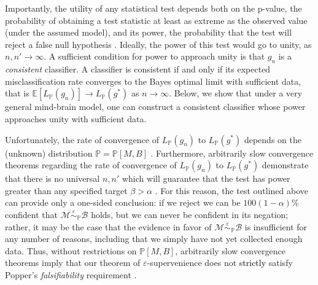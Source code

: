 \documentclass{article}
\newcommand{\conv}{\rightarrow}
\newcommand{\mB}{\mathcal{B}}
\newcommand{\mM}{\mathcal{M}}
\newcommand{\PP}{\mathbb{P}}           %
\newcommand{\EE}{\mathbb{E}}           %
\newcommand{\eps}{\varepsilon}
\providecommand{\mc}[1]{\mathcal{#1}}
\newcommand{\MeB}{\mM \overset{\varepsilon}{{\sim}}_{\PP} \mB}
\providecommand{\tr}[1]{\textcolor{black}{#1}}
\newtheorem{thm}{Theorem}
\begin{document}
Importantly, the utility of any statistical test depends both on the p-value, the probability of obtaining a test statistic at least as extreme as the observed value (under the assumed model), and its power, the probability that the test will reject a false null hypothesis%
.  Ideally, the power of this test would go to unity, as $n,n' \rightarrow \infty$.  A sufficient condition for power to approach unity is that $g_n$ is a \emph{consistent} classifier.  A classifier is consistent if and only if its expected misclassification rate converges to the Bayes optimal limit with sufficient data, that is $\EE[L_{\PP}(g_n)] \conv L_{\PP}(g^*)$ as $n\conv \infty$. %
% 
Below, we show that under a very general mind-brain model, one can construct a consistent classifier whose power approaches unity with sufficient data.

Unfortunately, the rate of convergence of $L_{\PP}(g_n)$ to $L_{\PP}(g^*)$ depends on the (unknown) distribution $\PP=\PP[M,B]$ \cite{DGL96}. Furthermore, arbitrarily slow convergence theorems regarding the rate of convergence of $L_{\PP}(g_n)$ to $L_{\PP}(g^*)$ demonstrate that there is no universal $n,n'$ which will guarantee that the test has power greater than any specified target $\beta > \alpha$ \cite{Devroye83}. For this reason, the test outlined above can provide only a one-sided conclusion: if we reject we can be $100(1-\alpha)$\% confident that $\MeB$ holds, but we can never be confident in its negation; rather, %
it may be the case that the evidence in favor of $\MeB$ is insufficient for any number of reasons, including that we simply have not yet collected enough data. %
Thus, without restrictions on $\PP[M,B]$, arbitrarily slow convergence theorems imply that our theorem of $\varepsilon$-supervenience does not \tr{strictly} satisfy Popper's {\it falsifiability} requirement \cite{Popper}. %
\end{document}

